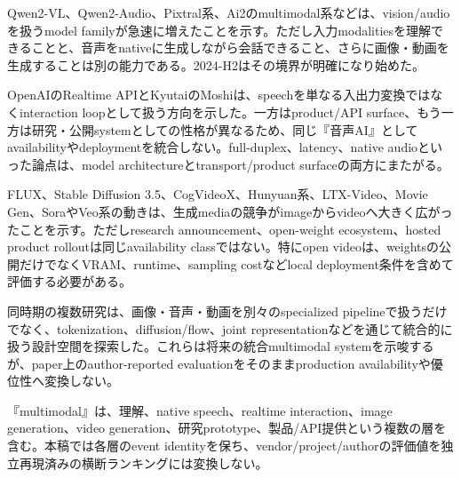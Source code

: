 
Qwen2-VL、Qwen2-Audio、Pixtral系、Ai2のmultimodal系などは、vision/audioを扱うmodel familyが急速に増えたことを示す。ただし入力modalitiesを理解できることと、音声をnativeに生成しながら会話できること、さらに画像・動画を生成することは別の能力である。2024-H2はその境界が明確になり始めた。\autocite{src-56b3abdc51a9,src-72d4a57e9c16,src-9f35f00f9f9c,src-d483c7d9838b,src-feb76866f5df}


OpenAIのRealtime APIとKyutaiのMoshiは、speechを単なる入出力変換ではなくinteraction loopとして扱う方向を示した。一方はproduct/API surface、もう一方は研究・公開systemとしての性格が異なるため、同じ『音声AI』としてavailabilityやdeploymentを統合しない。full-duplex、latency、native audioといった論点は、model architectureとtransport/product surfaceの両方にまたがる。\autocite{src-4a870e1e2c95,src-c5ed64e39d0c}


FLUX、Stable Diffusion 3.5、CogVideoX、Hunyuan系、LTX-Video、Movie Gen、SoraやVeo系の動きは、生成mediaの競争がimageからvideoへ大きく広がったことを示す。ただしresearch announcement、open-weight ecosystem、hosted product rolloutは同じavailability classではない。特にopen videoは、weightsの公開だけでなくVRAM、runtime、sampling costなどlocal deployment条件を含めて評価する必要がある。\autocite{src-06d2114e2823,src-2d134659d4de,src-d1b80acf98c2,src-d33cd3d41599,src-d50c19922f51,src-e91cbf23fde6,src-f6c8da8253fb}


同時期の複数研究は、画像・音声・動画を別々のspecialized pipelineで扱うだけでなく、tokenization、diffusion/flow、joint representationなどを通じて統合的に扱う設計空間を探索した。これらは将来の統合multimodal systemを示唆するが、paper上のauthor-reported evaluationをそのままproduction availabilityや優位性へ変換しない。\autocite{src-25c4073c2a29,src-5ff9bff435a6,src-680a61ed20c0,src-770e33132b09,src-e38a55668df9,src-e7d2578ccb4d,src-f6b059ed7fb2,src-fa0d8178b72a}


\begin{claimboundary}
『multimodal』は、理解、native speech、realtime interaction、image generation、video generation、研究prototype、製品/API提供という複数の層を含む。本稿では各層のevent identityを保ち、vendor/project/authorの評価値を独立再現済みの横断ランキングには変換しない。\autocite{src-c5ed64e39d0c}
\end{claimboundary}
